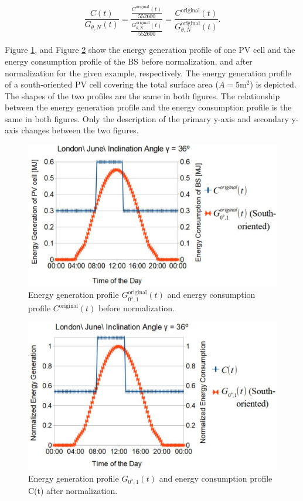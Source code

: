 \begin{equation}
\frac{C(t)}{G_{\theta,N}(t)}=\frac{\frac{C^{\text{original}}(t)}{552600}}{\frac{G_{\theta,N}^{\text{original}}(t)}{552600}}=\frac{C^{\text{original}}(t)}{G_{\theta,N}^{\text{original}}(t)}.
\end{equation}



Figure \ref{gggg}, and Figure \ref{gg} show the energy generation profile of one PV cell and the energy consumption profile of the BS before normalization, and after normalization for the given example, respectively. The energy generation profile of a south-oriented PV cell covering the total surface area ($A=5\mathrm{m^2}$) is depicted. The shapes of the two profiles are the same in both figures. The relationship between the energy generation profile and the energy consumption profile is the same in both figures. Only the description of the primary y-axis and secondary y-axis changes between the two figures. 

\begin{figure}[H]
	\centering
		\includegraphics[width=1\columnwidth]{pictures/gggg}
\caption{Energy generation profile $G_{0^{\mathrm{o}},1}^{\text{original}}(t)$ and energy consumption profile $C^{\text{original}}(t)$ before normalization. \label{gggg}}
\end{figure}


\begin{figure}[H]
	\centering
		\includegraphics[width=1\columnwidth]{pictures/gg}
\caption{Energy generation profile $G_{0^{\mathrm{o}},1}(t)$ and energy consumption profile C(t) after normalization.\label{gg}}
\end{figure}


